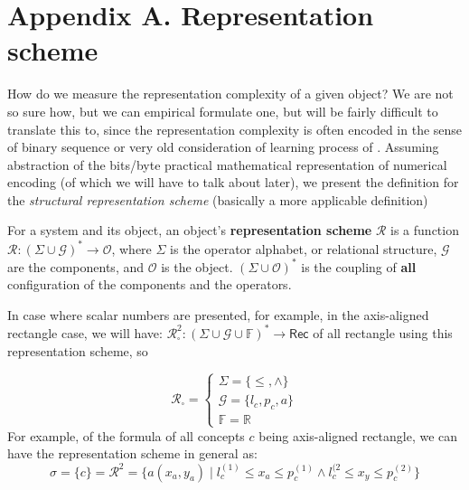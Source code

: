 \clearpage
\section{Appendix A. Representation scheme}

How do we measure the representation complexity of a given object? We are not so sure how, but we can empirical formulate one, but will be fairly difficult to translate this to, since the representation complexity is often encoded in the sense of binary sequence or very old consideration of learning process of \cite{10.5555/200548}. Assuming abstraction of the bits/byte practical mathematical representation of numerical encoding (of which we will have to talk about later), we present the definition for the \textit{structural representation scheme} (basically a more applicable definition)

\begin{definition}
    For a system and its object, an object's \textbf{representation scheme} $\mathcal{R}$ is a function $\bm{\mathcal{R}}: (\Sigma\cup \mathcal{G})^{*}\to \mathcal{O}$, where $\Sigma$ is the operator alphabet, or relational structure, $\mathcal{G}$ are the components, and $\mathcal{O}$ is the object. $(\Sigma \cup \mathcal{O})^{*}$ is the coupling of \textbf{all} configuration of the components and the operators. 
\end{definition}

In case where scalar numbers are presented, for example, in the axis-aligned rectangle case, we will have: $\bm{\mathcal{R}}^{2}_{\square}:(\Sigma\cup \mathcal{G}\cup\mathbb{F})^{*}\to \mathsf{Rec}$ of all rectangle using this representation scheme, so 

\begin{equation}
    \bm{\mathcal{R}}_{\square} = \begin{cases}
        \Sigma = \{\leq, \land \}\\
        \mathcal{G} = \{l_{c}, p_{c}, a\}\\
        \mathbb{F} = \mathbb{R}
    \end{cases}
\end{equation}
For example, of the formula of all concepts $c$ being axis-aligned rectangle, we can have the representation scheme in general as: 
\begin{equation}
    \sigma = \{c\} = \bm{\mathcal{R}}^{2} = \{a(x_{a},y_{a}) \mid l_{c}^{(1)} \leq x_{a}\leq p_{c}^{(1)}\land l_{c}^{(2} \leq x_{y}\leq p_{c}^{(2)}\}
\end{equation}

